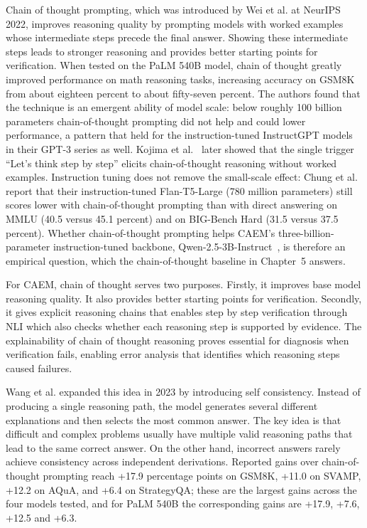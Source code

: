 Chain of thought prompting, which was introduced by Wei et al. \cite{wei2022chain} at NeurIPS 2022, improves reasoning quality by prompting models with worked examples whose intermediate steps precede the final answer. Showing these intermediate steps leads to stronger reasoning and provides better starting points for verification. When tested on the PaLM 540B model, chain of thought greatly improved performance on math reasoning tasks, increasing accuracy on GSM8K from about eighteen percent to about fifty-seven percent. The authors found that the technique is an emergent ability of model scale: below roughly 100 billion parameters chain-of-thought prompting did not help and could lower performance, a pattern that held for the instruction-tuned InstructGPT models in their GPT-3 series as well. Kojima et al.~\cite{kojima2022large} later showed that the single trigger ``Let's think step by step'' elicits chain-of-thought reasoning without worked examples. Instruction tuning does not remove the small-scale effect: Chung et al.\ \cite{JMLR:v25:23-0870} report that their instruction-tuned Flan-T5-Large (780 million parameters) still scores lower with chain-of-thought prompting than with direct answering on MMLU (40.5 versus 45.1 percent) and on BIG-Bench Hard (31.5 versus 37.5 percent). Whether chain-of-thought prompting helps CAEM's three-billion-parameter instruction-tuned backbone, Qwen-2.5-3B-Instruct~\cite{qwen25}, is therefore an empirical question, which the chain-of-thought baseline in Chapter~5 answers.

For CAEM, chain of thought serves two purposes. Firstly, it improves base model reasoning quality. It also provides better starting points for verification. Secondly, it gives explicit reasoning chains that enables step by step verification through NLI which also checks whether each reasoning step is supported by evidence. The explainability of chain of thought reasoning proves essential for diagnosis when verification fails, enabling error analysis that identifies which reasoning steps caused failures.

Wang et al. \cite{wang2023selfconsistency} expanded this idea in 2023 by introducing self consistency. Instead of producing a single reasoning path, the model generates several different explanations and then selects the most common answer. The key idea is that difficult and complex problems usually have multiple valid reasoning paths that lead to the same correct answer. On the other hand, incorrect answers rarely achieve consistency across independent derivations. Reported gains over chain-of-thought prompting reach +17.9 percentage points on GSM8K, +11.0 on SVAMP, +12.2 on AQuA, and +6.4 on StrategyQA; these are the largest gains across the four models tested, and for PaLM 540B the corresponding gains are +17.9, +7.6, +12.5 and +6.3.

